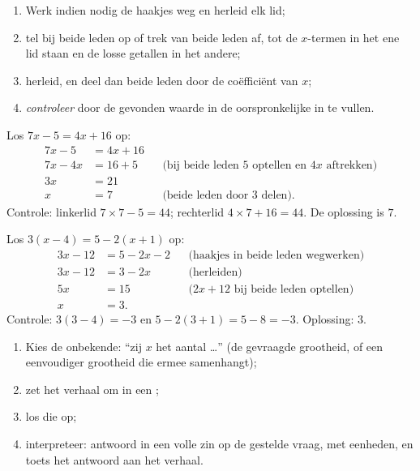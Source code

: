 \begin{method}\label{met:g8:equations:solve}
\begin{enumerate}
  \item Werk indien nodig de haakjes weg en herleid elk lid;
  \item tel bij beide leden op of trek van beide leden af, tot de
        $x$-termen in het ene lid staan en de losse getallen in het andere;
  \item herleid, en deel dan beide leden door de coëfficiënt van $x$;
  \item \emph{controleer} door de gevonden waarde in de oorspronkelijke
         in te vullen.
\end{enumerate}
\end{method}

\begin{example}\label{ex:g8:equations:solve}
Los $7x - 5 = 4x + 16$ op:
\begin{align*}
7x - 5 &= 4x + 16 \\
7x - 4x &= 16 + 5
&& \text{(bij beide leden $5$ optellen en $4x$ aftrekken)} \\
3x &= 21 \\
x &= 7 && \text{(beide leden door 3 delen).}
\end{align*}
Controle: linkerlid $7 \times 7 - 5 = 44$; rechterlid
$4 \times 7 + 16 = 44$. De oplossing is $7$.
\end{example}

\begin{example}\label{ex:g8:equations:brackets}
Los $3(x - 4) = 5 - 2(x + 1)$ op:
\begin{align*}
3x - 12 &= 5 - 2x - 2 && \text{(haakjes in beide leden wegwerken)} \\
3x - 12 &= 3 - 2x && \text{(herleiden)} \\
5x &= 15 && \text{($2x + 12$ bij beide leden optellen)} \\
x &= 3 .
\end{align*}
Controle: $3(3 - 4) = -3$ en $5 - 2(3+1) = 5 - 8 = -3$. \quad Oplossing:
$3$.
\end{example}

\begin{method}\label{met:g8:equations:problem}
\begin{enumerate}
  \item Kies de onbekende: ``zij $x$ het aantal \dots'' (de gevraagde grootheid,
        of een eenvoudiger grootheid die ermee samenhangt);
  \item zet het verhaal om in een ;
  \item los die op;
  \item interpreteer: antwoord in een volle zin op de gestelde vraag, met
        eenheden, en toets het antwoord aan het verhaal.
\end{enumerate}
\end{method}


